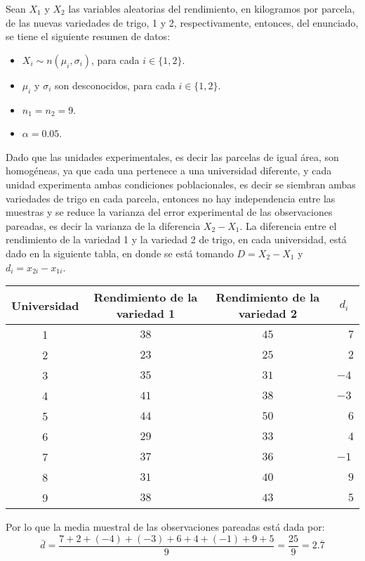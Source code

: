 \begin{solucion}
 Sean $X_1$ y $X_2$ las variables aleatorias del rendimiento, en kilogramos por parcela, de las nuevas variedades de trigo, 1 y 2, respectivamente, entonces, del enunciado, se tiene el siguiente resumen de datos:
 \begin{itemize}
  \item $X_i \sim n(\mu_i, \sigma_i)$, para cada $i \in \{ 1, 2 \}$.
  \item $\mu_i$ y $\sigma_i$ son desconocidos, para cada $i \in \{ 1, 2 \}$.
  \item $n_1 = n_2 = 9$.
  \item $\alpha = 0.05$.
 \end{itemize}
 Dado que las unidades experimentales, es decir las parcelas de igual \'area, son homog\'eneas, ya que cada una pertenece a una universidad diferente, y cada unidad experimenta ambas condiciones poblacionales, es decir se siembran ambas variedades de trigo en cada parcela, entonces no hay independencia entre las muestras y se reduce la varianza del error experimental de las observaciones pareadas, es decir la varianza de la diferencia $X_2 - X_1$. La diferencia entre el rendimiento de la variedad 1 y la variedad 2 de trigo, en cada universidad, está dado en la siguiente tabla, en donde se est\'a tomando $D = X_2 - X_1$ y $d_i = x_{2i} - x_{1i}$.
 \begin{center}
  \begin{tabular}{cccc}
   \textbf{Universidad} & \textbf{Rendimiento de la variedad 1} & \textbf{Rendimiento de la variedad 2} & $d_i$ \\
   \hline 
   1 & $38$ & $45$ & $\phantom{-}7$ \\
   2 & $23$ & $25$ & $\phantom{-}2$ \\
   3 & $35$ & $31$ & $-4$ \\
   4 & $41$ & $38$ & $-3$ \\
   5 & $44$ & $50$ & $\phantom{-}6$ \\
   6 & $29$ & $33$ & $\phantom{-}4$ \\
   7 & $37$ & $36$ & $-1$ \\
   8 & $31$ & $40$ & $\phantom{-}9$ \\
   9 & $38$ & $43$ & $\phantom{-}5$
  \end{tabular}
 \end{center}
 Por lo que la media muestral de las observaciones pareadas est\'a dada por:
 \begin{equation*}
  \bar{d} = \frac{7 + 2 + (-4) + (-3) + 6 + 4 + (-1) + 9 + 5}{9} = \frac{25}{9} = 2.\overline{7}

\end{equation*}
\end{solucion}
